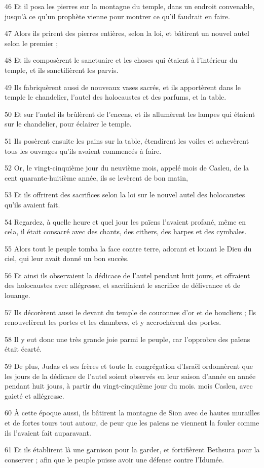 \par 46 Et il posa les pierres sur la montagne du temple, dans un endroit convenable, jusqu'à ce qu'un prophète vienne pour montrer ce qu'il faudrait en faire.
\par 47 Alors ils prirent des pierres entières, selon la loi, et bâtirent un nouvel autel selon le premier ;
\par 48 Et ils composèrent le sanctuaire et les choses qui étaient à l'intérieur du temple, et ils sanctifièrent les parvis.
\par 49 Ils fabriquèrent aussi de nouveaux vases sacrés, et ils apportèrent dans le temple le chandelier, l'autel des holocaustes et des parfums, et la table.
\par 50 Et sur l'autel ils brûlèrent de l'encens, et ils allumèrent les lampes qui étaient sur le chandelier, pour éclairer le temple.
\par 51 Ils posèrent ensuite les pains sur la table, étendirent les voiles et achevèrent tous les ouvrages qu'ils avaient commencés à faire.
\par 52 Or, le vingt-cinquième jour du neuvième mois, appelé mois de Casleu, de la cent quarante-huitième année, ils se levèrent de bon matin,
\par 53 Et ils offrirent des sacrifices selon la loi sur le nouvel autel des holocaustes qu'ils avaient fait.
\par 54 Regardez, à quelle heure et quel jour les païens l'avaient profané, même en cela, il était consacré avec des chants, des cithers, des harpes et des cymbales.
\par 55 Alors tout le peuple tomba la face contre terre, adorant et louant le Dieu du ciel, qui leur avait donné un bon succès.
\par 56 Et ainsi ils observaient la dédicace de l'autel pendant huit jours, et offraient des holocaustes avec allégresse, et sacrifiaient le sacrifice de délivrance et de louange.
\par 57 Ils décorèrent aussi le devant du temple de couronnes d'or et de boucliers ; Ils renouvelèrent les portes et les chambres, et y accrochèrent des portes.
\par 58 Il y eut donc une très grande joie parmi le peuple, car l'opprobre des païens était écarté.
\par 59 De plus, Judas et ses frères et toute la congrégation d'Israël ordonnèrent que les jours de la dédicace de l'autel soient observés en leur saison d'année en année pendant huit jours, à partir du vingt-cinquième jour du mois. mois Casleu, avec gaieté et allégresse.
\par 60 À cette époque aussi, ils bâtirent la montagne de Sion avec de hautes murailles et de fortes tours tout autour, de peur que les païens ne viennent la fouler comme ils l'avaient fait auparavant.
\par 61 Et ils établirent là une garnison pour la garder, et fortifièrent Bethsura pour la conserver ; afin que le peuple puisse avoir une défense contre l'Idumée.


